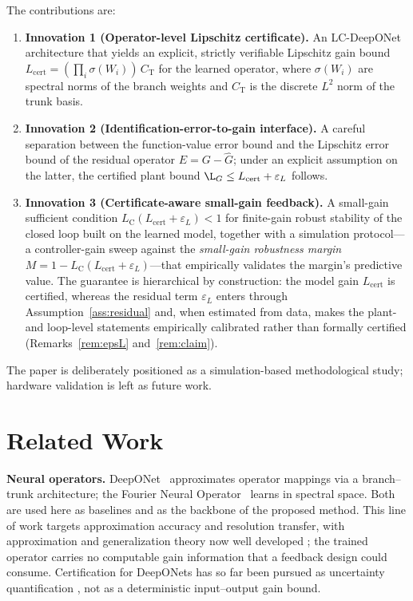 \documentclass[11pt]{article}
\newcommand{\Ltwo}{L^2}
\newcommand{\Ghat}{\hat{G}}
\newcommand{\Lhat}{L_{\mathrm{cert}}}
\newcommand{\epsL}{\varepsilon_L}
\newcommand{\LC}{L_{\mathrm{C}}}
\begin{document}
The contributions are:
\begin{enumerate}
  \item \textbf{Innovation 1 (Operator-level Lipschitz certificate).} An
  LC-DeepONet architecture that yields an
  explicit, strictly verifiable Lipschitz gain bound
  $\Lhat=(\prod_i \sigma(W_i))\, C_{\mathrm{T}}$ for the learned operator,
  where $\sigma(W_i)$ are spectral norms of the branch weights and
  $C_{\mathrm{T}}$ is the discrete $\Ltwo$ norm of the trunk basis.
  \item \textbf{Innovation 2 (Identification-error-to-gain interface).} A
  careful separation between the
  function-value error bound and the Lipschitz error bound of the residual
  operator $E=G-\Ghat$; under an explicit assumption on the latter, the
  certified plant bound $\L_G\le\Lhat+\epsL$ follows.
  \item \textbf{Innovation 3 (Certificate-aware small-gain feedback).} A
  small-gain sufficient condition
  $\LC(\Lhat+\epsL)<1$ for finite-gain robust stability of the closed loop
  built on the learned model, together with a simulation protocol---a
  controller-gain sweep against the \emph{small-gain robustness margin}
  $M=1-\LC(\Lhat+\epsL)$---that empirically validates the margin's predictive
  value. The guarantee is hierarchical by construction: the model gain
  $\Lhat$ is certified, whereas the residual term $\epsL$ enters through
  Assumption~\ref{ass:residual} and, when estimated from data, makes the
  plant- and loop-level statements empirically calibrated rather than
  formally certified (Remarks~\ref{rem:epsL} and~\ref{rem:claim}).
\end{enumerate}

The paper is deliberately positioned as a simulation-based methodological
study; hardware validation is left as future work.

\section{Related Work}\label{sec:related}

\textbf{Neural operators.} DeepONet~\citep{lu2021deeponet} approximates
operator mappings via a branch--trunk architecture; the Fourier Neural
Operator~\citep{li2021fno} learns in spectral space. Both are used here as
baselines and as the backbone of the proposed method. This line of work
targets approximation accuracy and resolution transfer, with approximation
and generalization theory now well developed \citep{lanthaler2022error}; the
trained operator carries no computable gain information that a feedback design
could consume. Certification for DeepONets has so far been pursued as
uncertainty quantification \citep{moya2025conformal}, not as a deterministic
input--output gain bound.
\end{document}
